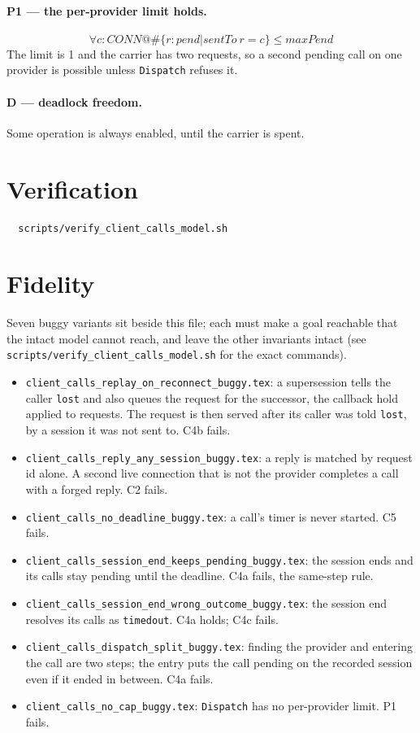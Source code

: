 \documentclass[a4paper,10pt,fleqn]{article}
\begin{document}
\paragraph{P1 --- the per-provider limit holds.}
\[
  \forall c : CONN @ \# \{ r : pend | sentTo~r = c \} \leq maxPend
\]
The limit is 1 and the carrier has two requests, so a second pending call on
one provider is possible unless \texttt{Dispatch} refuses it.

\paragraph{D --- deadlock freedom.}
Some operation is always enabled, until the carrier is spent.

\section{Verification}
\label{sec:verify}

\begin{verbatim}
  scripts/verify_client_calls_model.sh
\end{verbatim}

\section{Fidelity}

Seven buggy variants sit beside this file; each must make a goal reachable
that the intact model cannot reach, and leave the other invariants intact
(see \texttt{scripts/verify\_client\_calls\_model.sh} for the exact commands).
\begin{itemize}
  \item \texttt{client\_calls\_replay\_on\_reconnect\_buggy.tex}: a
    supersession tells the caller \texttt{lost} and also queues the request
    for the successor, the callback hold applied to requests.  The request
    is then served after its caller was told \texttt{lost}, by a session it
    was not sent to.  C4b fails.
  \item \texttt{client\_calls\_reply\_any\_session\_buggy.tex}: a reply is
    matched by request id alone.  A second live connection that is not the
    provider completes a call with a forged reply.  C2 fails.
  \item \texttt{client\_calls\_no\_deadline\_buggy.tex}: a call's timer is
    never started.  C5 fails.
  \item \texttt{client\_calls\_session\_end\_keeps\_pending\_buggy.tex}: the
    session ends and its calls stay pending until the deadline.  C4a fails,
    the same-step rule.
  \item \texttt{client\_calls\_session\_end\_wrong\_outcome\_buggy.tex}: the
    session end resolves its calls as \texttt{timedout}.  C4a holds; C4c
    fails.
  \item \texttt{client\_calls\_dispatch\_split\_buggy.tex}: finding the
    provider and entering the call are two steps; the entry puts the call
    pending on the recorded session even if it ended in between.  C4a fails.
  \item \texttt{client\_calls\_no\_cap\_buggy.tex}: \texttt{Dispatch} has no
    per-provider limit.  P1 fails.
\end{itemize}
\end{document}
